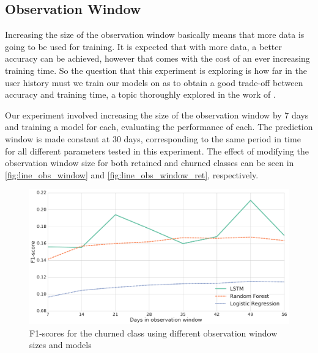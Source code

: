 \documentclass{kththesis}
\begin{document}
\subsection{Observation Window}

Increasing the size of the observation window basically means that more data is going to be used for training. It is expected that with more data, a better accuracy can be achieved, however that comes with the cost of an ever increasing training time. So the question that this experiment is exploring is how far in the user history must we train our models on as to obtain a good trade-off between accuracy and training time, a topic thoroughly explored in the work of \citep{Ballings2012}.

Our experiment involved increasing the size of the observation window by 7 days and training a model for each, evaluating the performance of each. The prediction window is made constant at 30 days, corresponding to the same period in time for all different parameters tested in this experiment. The effect of modifying the observation window size for both retained and churned classes can be seen in \autoref{fig:line_obs_window} and \autoref{fig:line_obs_window_ret}, respectively. 

\begin{figure}
    \centering
    \includegraphics[width=1.0\textwidth,keepaspectratio]{figures/line_obs_window.pdf}
    \caption{F1-scores for the churned class using different observation window sizes and models}
    \label{fig:line_obs_window}
\end{figure}
\end{document}

